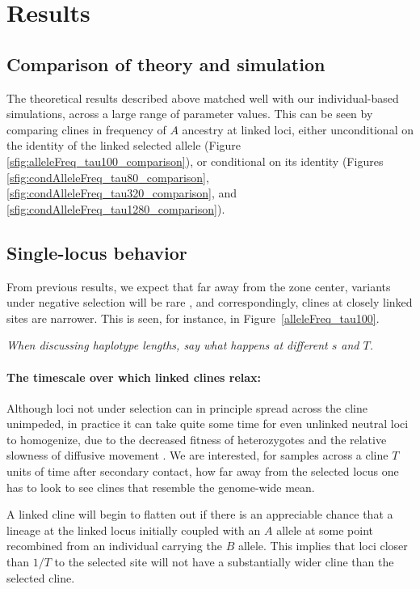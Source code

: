 \documentclass[11pt,letterpaper]{article}
\newcommand{\plr}[1]{{\em \color{blue} #1}}
\begin{document}
\section*{Results}

\subsection*{Comparison of theory and simulation}

The theoretical results described above matched well with our individual-based simulations,
across a large range of parameter values.
This can be seen by comparing
clines in frequency of $A$ ancestry at linked loci,
either unconditional on the identity of the linked selected allele (Figure \ref{sfig:alleleFreq_tau100_comparison}),
or conditional on its identity 
(Figures \ref{sfig:condAlleleFreq_tau80_comparison}, \ref{sfig:condAlleleFreq_tau320_comparison}, and \ref{sfig:condAlleleFreq_tau1280_comparison}).


\subsection*{Single-locus behavior}

From previous results, we expect that far away from the zone center, variants under negative selection will be rare \citep[for demonstration of this theoretical result, see e.g.][]{May1975,Slatkin1973,Barton??}, and correspondingly, clines at closely linked sites are narrower.
This is seen, for instance, in Figure~\ref{alleleFreq_tau100}. 

\plr{When discussing haplotype lengths, say what happens at different $s$ and $T$.}

\paragraph{The timescale over which linked clines relax:}
Although loci not under selection can in principle spread across the cline unimpeded,
in practice it can take quite some time for even unlinked neutral loci to homogenize,
due to the decreased fitness of heterozygotes \citep{Barton1986}
and the relative slowness of diffusive movement \citep{Sedghifar2015}.
We are interested, for samples across a cline $T$ units of time after secondary contact, how far away from the selected locus one has to look to see clines that resemble the genome-wide mean.


A linked cline will begin to flatten out if there is an appreciable chance that a lineage at the linked locus initially coupled with an $A$ allele 
at some point recombined from an individual carrying the $B$ allele.
This implies that loci closer than $1/T$ to the selected site will not have a substantially wider cline than the selected cline.
\end{document}
